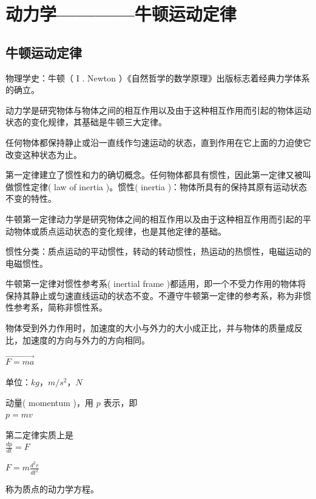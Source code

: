 	\section{动力学————牛顿运动定律}
	\subsection{牛顿运动定律}
	
	
	
	{\footnotesize 物理学史：牛顿（ I . Newton ）《自然哲学的数学原理》出版标志着经典力学体系的确立。}
	
	
	动力学是研究物体与物体之间的相互作用以及由于这种相互作用而引起的物体运动状态的变化规律，其基础是牛顿三大定律。
	\begin{theorem}[牛顿第一定律]
		任何物体都保持静止或沿一直线作匀速运动的状态，直到作用在它上面的力迫使它改变这种状态为止。
	\end{theorem}
	\begin{note}
	 	第一定律建立了惯性和力的确切概念。任何物体都具有惯性，因此第一定律又被叫做惯性定律( law of inertia )。惯性( inertia )：物体所具有的保持其原有运动状态不变的特性。
	
	牛顿第一定律动力学是研究物体之间的相互作用以及由于这种相互作用而引起的平动物体或质点运动状态的变化规律，也是其他定律的基础。
	
	惯性分类：质点运动的平动惯性，转动的转动惯性，热运动的热惯性，电磁运动的电磁惯性。
	
	牛顿第一定律对惯性参考系( inertial frame )都适用，即一个不受力作用的物体将保持其静止或匀速直线运动的状态不变。不遵守牛顿第一定律的参考系，称为非惯性参考系，简称非惯性系。
	\end{note}
	\begin{theorem}[牛顿第二定律]
		
		物体受到外力作用时，加速度的大小与外力的大小成正比，并与物体的质量成反比，加速度的方向与外力的方向相同。
	
\centering	$ \vec{F=ma } $
	
	单位：$kg ，m /s^2，N$ 
	
	动量( momentum )，用 $p$ 表示，即\\
	
	$ p=mv $
	
	第二定律实质上是\\
	
	$ \frac{dp}{dt}= F  $
	
	
	
	$ F=m\frac{d^{2}r}{dt^{2}} $
	
	称为质点的动力学方程。\\
	\end{theorem}

